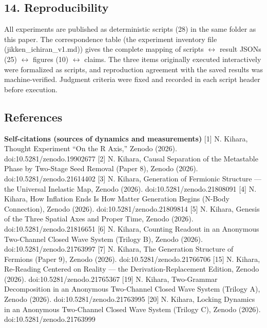 \documentclass[
]{article}
\begin{document}
\subsection{14. Reproducibility}\label{reproducibility}

All experiments are published as deterministic scripts (28) in the same
folder as this paper. The correspondence table (the experiment inventory
file (jikken\_ichiran\_v1.md)) gives the complete mapping of scripts
\(\leftrightarrow\) result JSONs (25) \(\leftrightarrow\) figures (10)
\(\leftrightarrow\) claims. The three items originally executed
interactively were formalized as scripts, and reproduction agreement
with the saved results was machine-verified. Judgment criteria were
fixed and recorded in each script header before execution.

\subsection{References}\label{references}

\textbf{Self-citations (sources of dynamics and measurements)} {[}1{]}
N. Kihara, Thought Experiment ``On the R Axis,'' Zenodo (2026).
doi:10.5281/zenodo.19902677 {[}2{]} N. Kihara, Causal Separation of the
Metastable Phase by Two-Stage Seed Removal (Paper 8), Zenodo (2026).
doi:10.5281/zenodo.21614402 {[}3{]} N. Kihara, Generation of Fermionic
Structure --- the Universal Inelastic Map, Zenodo (2026).
doi:10.5281/zenodo.21808091 {[}4{]} N. Kihara, How Inflation Ends Is How
Matter Generation Begins (N-Body Connection), Zenodo (2026).
doi:10.5281/zenodo.21809814 {[}5{]} N. Kihara, Genesis of the Three
Spatial Axes and Proper Time, Zenodo (2026). doi:10.5281/zenodo.21816651
{[}6{]} N. Kihara, Counting Readout in an Anonymous Two-Channel Closed
Wave System (Trilogy B), Zenodo (2026). doi:10.5281/zenodo.21763997
{[}7{]} N. Kihara, The Generation Structure of Fermions (Paper 9),
Zenodo (2026). doi:10.5281/zenodo.21766706 {[}15{]} N. Kihara,
Re-Reading Centered on Reality --- the Derivation-Replacement Edition,
Zenodo (2026). doi:10.5281/zenodo.21765367 {[}19{]} N. Kihara,
Two-Grammar Decomposition in an Anonymous Two-Channel Closed Wave System
(Trilogy A), Zenodo (2026). doi:10.5281/zenodo.21763995 {[}20{]} N.
Kihara, Locking Dynamics in an Anonymous Two-Channel Closed Wave System
(Trilogy C), Zenodo (2026). doi:10.5281/zenodo.21763999
\end{document}
